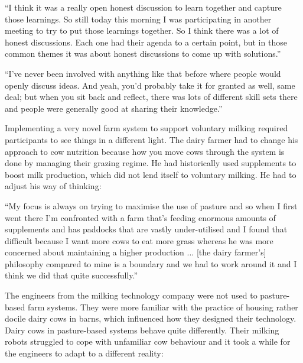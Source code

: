 \begin{displayquote}[Participant 10/2]
\small
\enquote{I think it was a really open honest discussion to learn together and capture those learnings. So still today this morning I was participating in another meeting to try to put those learnings together. So I think there was a lot of honest discussions. Each one had their agenda to a certain point, but in those common themes it was about honest discussions to come up with solutions.} 
\end{displayquote}


\begin{displayquote}[Participant 15/2]
\small
\enquote{I've never been involved with anything like that before where people would openly discuss ideas. And yeah, you'd probably take it for granted as well, same deal; but when you sit back and reflect, there was lots of different skill sets there and people were generally good at sharing their knowledge.} 
\end{displayquote}


Implementing a very novel farm system to support voluntary milking required participants to see things in a different light. The dairy farmer had to change his approach to cow nutrition because how you move cows through the system is done by managing their grazing regime. He had historically used supplements to boost milk production, which did not lend itself to voluntary milking. He had to adjust his way of thinking:

\begin{displayquote}[Participant 11/2]
\small
\enquote{My focus is always on trying to maximise the use of pasture and so when I first went there I'm confronted with a farm that's feeding enormous amounts of supplements and has paddocks that are vastly under-utilised and I found that difficult because I want more cows to eat more grass whereas he was more concerned about maintaining a higher production ... [the dairy farmer's] philosophy compared to mine is a boundary and we had to work around it and I think we did that quite successfully.} 
\end{displayquote}


The engineers from the milking technology company were not used to pasture-based farm systems. They were more familiar with the practice of housing rather docile dairy cows in barns, which influenced how they designed their technology. Dairy cows in pasture-based systems behave quite differently. Their milking robots struggled to cope with unfamiliar cow behaviour and it took a while for the engineers to adapt to a different reality:

